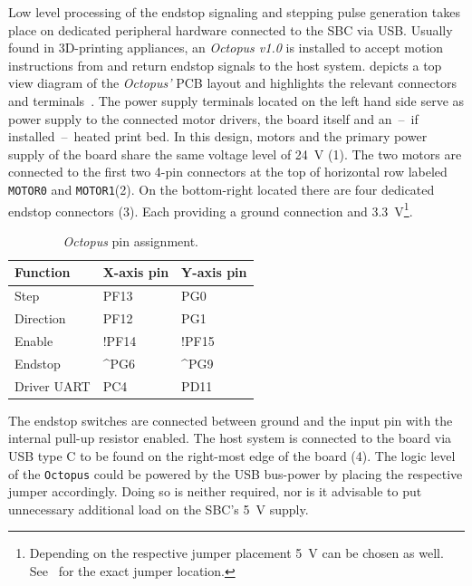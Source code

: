             Low level processing of the endstop signaling and stepping pulse generation takes place on dedicated peripheral hardware connected to the SBC via USB.
            Usually found in 3D-printing appliances, an \textit{Octopus v1.0} is installed to accept motion instructions from and return endstop signals to the host system.
             depicts a top view diagram of the \textit{Octopus'} PCB layout and highlights the relevant connectors and terminals~\cite{Manual.BigTreeTechOctopus}.
            The power supply terminals located on the left hand side serve as power supply to the connected motor drivers, the board itself and an~--~if installed~--~heated print bed.
            In this design, motors and the primary power supply of the board share the same voltage level of \qty{24}{\volt} (1).
            The two motors are connected to the first two 4-pin connectors at the top of horizontal row labeled \texttt{MOTOR0} and \texttt{MOTOR1}(2).
            On the bottom-right located there are four dedicated endstop connectors (3).
            Each providing a ground connection and \qty{3.3}{\volt}\footnote{Depending on the respective jumper placement \qty{5}{\volt} can be chosen as well. See~\cite{Manual.BigTreeTechOctopus} for the exact jumper location.}.

            \begin{table}[h]
                \centering
                \caption[\textit{Octopus} pin assignment]{\textit{Octopus} pin assignment.}
                \label{tab:octopus pin assignments}
                \begin{tabular}{@{}lll@{}}
                    \toprule
                    Function&   X-axis pin& Y-axis pin\\
                    \midrule
                    Step&       PF13&   PG0\\
                    Direction&  PF12&   PG1\\
                    Enable&     !PF14&  !PF15\\
                    Endstop&    \textasciicircum PG6&   \textasciicircum PG9\\
                    Driver UART& PC4&   PD11\\
                    \bottomrule
                \end{tabular}
            \end{table}

            The endstop switches are connected between ground and the input pin with the internal pull-up resistor enabled.
            The host system is connected to the board via USB type C to be found on the right-most edge of the board (4).
            The logic level of the \texttt{Octopus} could be powered by the USB bus-power by placing the respective jumper accordingly.
            Doing so is neither required, nor is it advisable to put unnecessary additional load on the SBC's \qty{5}{\volt} supply.

